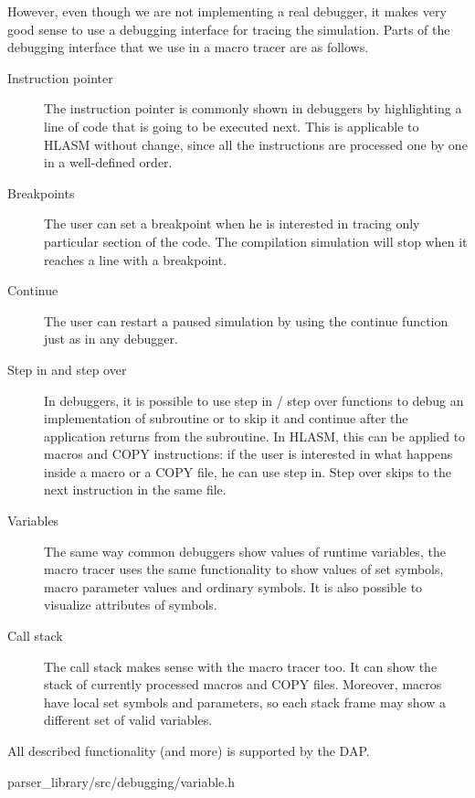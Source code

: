 However, even though we are not implementing a real debugger, it makes very good sense to use a debugging interface for tracing the simulation. Parts of the debugging interface that we use in a macro tracer are as follows.
\begin{description}
	\item [Instruction pointer] The instruction pointer is commonly shown in debuggers by highlighting a line of code that is going to be executed next. This is applicable to HLASM without change, since all the instructions are processed one by one in a well-defined order.
	\item [Breakpoints] The user can set a breakpoint when he is interested in tracing only particular section of the code. The compilation simulation will stop when it reaches a line with a breakpoint.
	\item [Continue] The user can restart a paused simulation by using the continue function just as in any debugger.
	\item [Step in and step over] In debuggers, it is possible to use step in / step over functions to debug an implementation of subroutine or to skip it and continue after the application returns from the subroutine. In HLASM, this can be applied to macros and COPY instructions: if the user is interested in what happens inside a macro or a COPY file, he can use step in. Step over skips to the next instruction in the same file.
	\item [Variables] The same way common debuggers show values of runtime variables, the macro tracer uses the same functionality to show values of set symbols, macro parameter values and ordinary symbols. It is also possible to visualize attributes of symbols.
	\item [Call stack] The call stack makes sense with the macro tracer too. It can show the stack of currently processed macros and COPY files. Moreover, macros have local set symbols and parameters, so each stack frame may show a different set of valid variables.
\end{description}
All described functionality (and more) is supported by the DAP. 

{parser\_library/src/debugging/variable.h}


